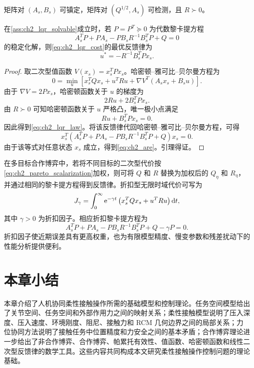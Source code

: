 \begin{assumption}[线性二次型问题的可解性]
\label{ass:ch2_lqr_solvable}
矩阵对 $(A_s,B_s)$ 可镇定，矩阵对 $(Q^{1/2},A_s)$ 可检测，且 $R\succ0$。
\end{assumption}

\begin{lemma}[线性二次型最优反馈律]
\label{lem:ch2_lqr}
在\cref{ass:ch2_lqr_solvable}成立时，若 $P=P^T\succeq0$ 为代数黎卡提方程
\begin{equation}
  A_s^TP+PA_s-PB_sR^{-1}B_s^TP+Q=0
  \label{eq:ch2_are}
\end{equation}
的稳定化解，则\eqref{eq:ch2_lqr_cost}的最优反馈律为
\begin{equation}
  u^*=-R^{-1}B_s^TPx_s .
  \label{eq:ch2_lqr_law}
\end{equation}
\end{lemma}

\begin{proof}
取二次型值函数 $V(x_s)=x_s^TPx_s$。哈密顿--雅可比--贝尔曼方程为
\begin{equation}
  0=\min_u\left[x_s^TQx_s+u^TRu+\nabla V^T(A_sx_s+B_su)\right].
\end{equation}
由于 $\nabla V=2Px_s$，哈密顿函数关于 $u$ 的梯度为
\begin{equation}
  2Ru+2B_s^TPx_s .
\end{equation}
由 $R\succ0$ 可知哈密顿函数关于 $u$ 严格凸，唯一极小点满足
\begin{equation}
  Ru+B_s^TPx_s=0 .
\end{equation}
因此得到\eqref{eq:ch2_lqr_law}。将该反馈律代回哈密顿--雅可比--贝尔曼方程，可得
\begin{equation}
  x_s^T\left(A_s^TP+PA_s-PB_sR^{-1}B_s^TP+Q\right)x_s=0 .
\end{equation}
由于该等式对任意状态 $x_s$ 成立，得到\eqref{eq:ch2_are}。引理得证。
\end{proof}

在多目标合作博弈中，若将不同目标的二次型代价按\eqref{eq:ch2_pareto_scalarization}加权，则可将 $Q$ 和 $R$ 替换为加权后的 $Q_\eta$ 和 $R_\eta$，并通过相同的黎卡提方程得到反馈律。折扣型无限时域代价可写为
\begin{equation}
  J_\gamma=\int_0^\infty \mathrm{e}^{-\gamma t}\left(x_s^TQx_s+u^TRu\right)\mathrm{d} t,
  \label{eq:ch2_discount_cost}
\end{equation}
其中 $\gamma>0$ 为折扣因子。相应折扣黎卡提方程为
\begin{equation}
  A_s^TP+PA_s-PB_sR^{-1}B_s^TP+Q-\gamma P=0 .
  \label{eq:ch2_discount_are}
\end{equation}
折扣因子使近期误差具有更高权重，也为有限模型精度、慢变参数和残差扰动下的性能分析提供便利。

\section{本章小结}
\label{sec:ch2_summary}

本章介绍了人机协同柔性接触操作所需的基础模型和控制理论。任务空间模型给出了关节空间、任务空间和外部作用力之间的映射关系；柔性接触模型说明了压入深度、压入速度、环境刚度、阻尼、接触力和 RCM 几何边界之间的局部关系；力位协同方法说明了接触任务中位置精度和力安全之间的基本矛盾；合作博弈理论进一步给出了非合作博弈、合作博弈、帕累托有效性、值函数、哈密顿函数和线性二次型反馈律的数学工具。这些内容共同构成本文研究柔性接触操作控制问题的理论基础。
